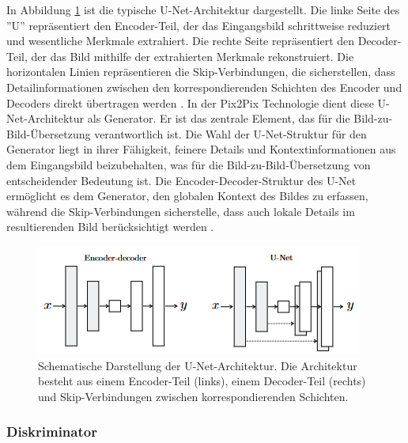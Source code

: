 In Abbildung \ref{fig:unet} ist die typische U-Net-Architektur dargestellt. Die linke Seite des ''U'' repräsentiert den Encoder-Teil, der das Eingangsbild schrittweise reduziert und wesentliche Merkmale extrahiert. Die rechte Seite repräsentiert den Decoder-Teil, der das Bild mithilfe der extrahierten Merkmale rekonstruiert. Die horizontalen Linien repräsentieren die Skip-Verbindungen, die sicherstellen, dass Detailinformationen zwischen den korrespondierenden Schichten des Encoder und Decoders direkt übertragen werden \cite{Isola}. \newline 
In der Pix2Pix Technologie dient diese U-Net-Architektur als Generator. Er ist das zentrale Element, das für die Bild-zu-Bild-Übersetzung verantwortlich ist. Die Wahl der U-Net-Struktur für den Generator liegt in ihrer Fähigkeit, feinere Details und Kontextinformationen aus dem Eingangsbild beizubehalten, was für die Bild-zu-Bild-Übersetzung von entscheidender Bedeutung ist. Die Encoder-Decoder-Struktur des U-Net ermöglicht es dem Generator, den globalen Kontext des Bildes zu erfassen, während die Skip-Verbindungen sicherstelle, dass auch lokale Details im resultierenden Bild berücksichtigt werden \cite{Isola}.

\begin{figure}[h]
	\centering
	\includegraphics[width=0.7\linewidth]{./images/unet.png}
	\caption{Schematische Darstellung der U-Net-Architektur. Die Architektur besteht aus einem Encoder-Teil (links), einem Decoder-Teil (rechts) und Skip-Verbindungen zwischen korrespondierenden Schichten.}
	\label{fig:unet}
\end{figure}

\subsubsection{Diskriminator}

